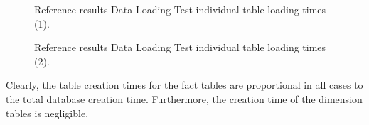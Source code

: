 \begin{figure}
   \begin{center}
   \end{center}
   \caption{Reference results Data Loading Test individual table loading times (1).}
   \label{fig:referenceResultsDataLoadingIndTimes1}
\end{figure}

\begin{figure}
   \begin{center}
   \end{center}
   \caption{Reference results Data Loading Test individual table loading times (2).}
   \label{fig:referenceResultsDataLoadingIndTimes2}
\end{figure}

Clearly, the table creation times for the fact tables are proportional in all cases to the total database creation time. Furthermore, the creation time of the dimension tables is negligible.

